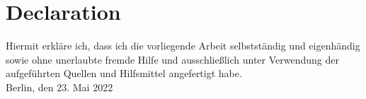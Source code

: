 \chapter*{Declaration}
\label{ch:Declaration}
Hiermit erkl\"are ich, dass ich die vorliegende Arbeit selbstst\"andig und eigenh\"andig sowie ohne unerlaubte fremde Hilfe und ausschlie\ss lich unter Verwendung der aufgef\"uhrten  Quel\-len und Hilfsmittel angefertigt habe.\\

\vspace{1.7cm}
Berlin, den 23. Mai 2022